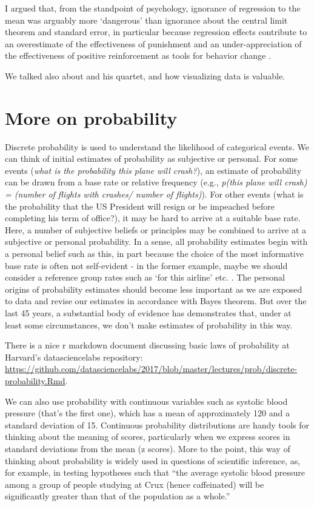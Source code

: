 \documentclass[]{book}
\theoremstyle{definition}
\theoremstyle{definition}
\theoremstyle{definition}
\theoremstyle{remark}
\begin{document}
I argued that, from the standpoint of psychology, ignorance of
regression to the mean was arguably more `dangerous' than ignorance
about the central limit theorem and standard error, in particular
because regression effects contribute to an overestimate of the
effectiveness of punishment and an under-appreciation of the
effectiveness of positive reinforcement as tools for behavior change
\citep{hastie2010rational}.

We talked also about \citet{anscombe1973graphs} and his quartet, and how
visualizing data is valuable.

\section{More on probability}\label{more-on-probability}

Discrete probability is used to understand the likelihood of categorical
events. We can think of initial estimates of probability as subjective
or personal. For some events (\emph{what is the probability this plane
will crash?}), an estimate of probability can be drawn from a base rate
or relative frequency (e.g., \emph{p(this plane will crash) = (number of
flights with crashes/ number of flights)}). For other events (what is
the probability that the US President will resign or be impeached before
completing his term of office?), it may be hard to arrive at a suitable
base rate. Here, a number of subjective beliefs or principles may be
combined to arrive at a subjective or personal probability. In a sense,
all probability estimates begin with a personal belief such as this, in
part because the choice of the most informative base rate is often not
self-evident - in the former example, maybe we should consider a
reference group rates such as `for this airline' etc.
\citep[(][]{lanning1987some}. The personal origins of probability
estimates should become less important as we are exposed to data and
revise our estimates in accordance with Bayes theorem. But over the last
45 years, a substantial body of evidence has demonstrates that, under at
least some circumstances, we don't make estimates of probability in this
way.

There is a nice r markdown document discussing basic laws of probability
at Harvard's datasciencelabs repository:
\url{https://github.com/datasciencelabs/2017/blob/master/lectures/prob/discrete-probability.Rmd}.

We can also use probability with continuous variables such as systolic
blood pressure (that's the first one), which has a mean of approximately
120 and a standard deviation of 15. Continuous probability distributions
are handy tools for thinking about the meaning of scores, particularly
when we express scores in standard deviations from the mean (z scores).
More to the point, this way of thinking about probability is widely used
in questions of scientific inference, as, for example, in testing
hypotheses such that ``the average systolic blood pressure among a group
of people studying at Crux (hence caffeinated) will be significantly
greater than that of the population as a whole.''
\end{document}

